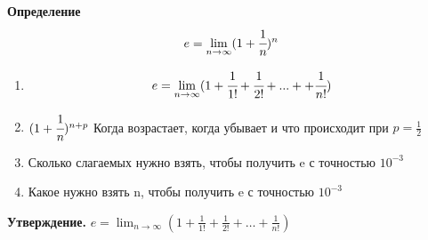 \begin{tcolorbox}
    \textbf{Определение} 
    \[e = \lim_{n\to \infty} (1+\cfrac{1}{n})^n \]
\end{tcolorbox}

\begin{tcolorbox}[title=Доказать/подумать]
    \begin{enumerate}
        \item \[ e = \lim_{n\to\infty} (1+\cfrac{1}{1!} +\cfrac{1}{2!} + ... + +\cfrac{1}{n!}) \]
	\item $(1+\cfrac{1}{n})^{n+p}$ Когда возрастает, когда убывает и что происходит при $p=\frac{1}{2}$
        \item Сколько слагаемых нужно взять, чтобы получить e с точностью $10^{-3}$\\
        \item Какое нужно взять n, чтобы получить e с точностью $10^{-3}$
    \end{enumerate}
\end{tcolorbox}

\textbf{Утверждение.} $e = \lim_{n\to\infty} \left(1 + \frac{1}{1!} + \frac{1}{2!} + \dots + \frac{1}{n!}\right)$

